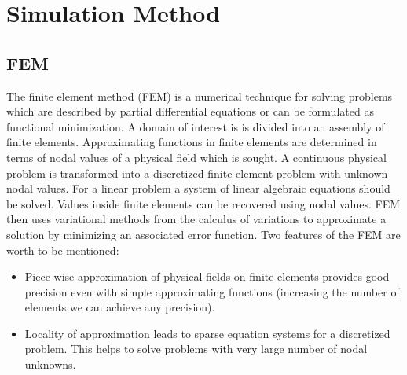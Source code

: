 %
% 
% 


\chapter{Simulation Method}
\label{sec:Simulation Method}

\section{FEM}
The finite element method (FEM) is a numerical technique for solving problems which are described by partial differential equations or can be formulated as functional minimization. A domain of interest is is divided into an assembly of finite elements. Approximating functions in finite elements are determined
in terms of nodal values of a physical field which is sought. A continuous physical problem is transformed into a discretized finite element problem with unknown nodal values. For a linear problem a system of linear algebraic equations should be solved. Values inside finite elements can be recovered
using nodal values. FEM then uses variational methods from the calculus of variations to approximate a solution by minimizing an associated error function.
Two features of the FEM are worth to be mentioned:
\begin{itemize}
\item Piece-wise approximation of physical fields on finite elements provides good precision even with
simple approximating functions (increasing the number of elements we can achieve any precision).
\item Locality of approximation leads to sparse equation systems for a discretized problem. This helps to
solve problems with very large number of nodal unknowns.
\end{itemize}

